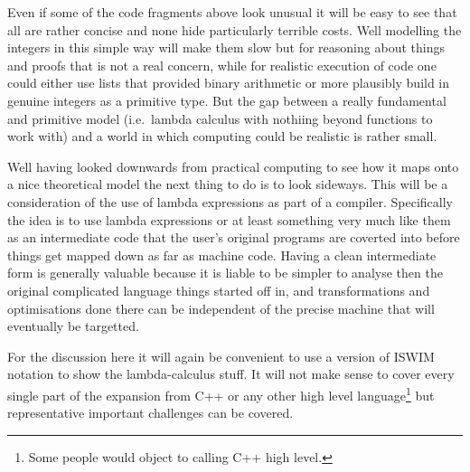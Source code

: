 Even if some of the code fragments above look unusual it will be easy to
see that all are rather concise and none hide particularly terrible
costs. Well modelling the integers in this simple way will make them slow
but for reasoning about things and proofs that is not a real concern, while
for realistic execution of code one could either use lists that provided
binary arithmetic or more plausibly build in genuine integers as a primitive
type. But the gap between a really fundamental and primitive model
(i.e.\ lambda calculus with nothiing beyond functions to work with) and
a world in which computing could be realistic is rather small.

Well having looked downwards from practical computing to see how it maps
onto a nice theoretical model the next thing to do is to look sideways. This
will be a consideration of the use of lambda expressions as part of
a compiler. Specifically the idea is to use lambda expressions or at least
something very much like them as an intermediate code that the user's
original programs are coverted into before things get mapped down as
far as machine code. Having a clean intermediate form is generally valuable
because it is liable to be simpler to analyse then the original
complicated language things started off in, and transformations and
optimisations done there can be independent of the precise machine that
will eventually be targetted.

For the discussion here it will again be convenient to use a version
of ISWIM notation to show the lambda-calculus stuff. It will not make
sense to cover every single part of the expansion from C++ or any other
high level language\footnote{Some people would object to calling C++
high level.} but representative important challenges can be covered.

